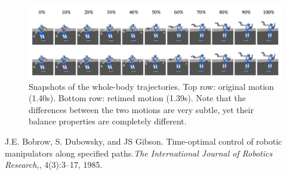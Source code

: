 \documentclass[journal]{IEEEtran}
\begin{document}
\begin{figure}[t]
  \centering
  \includegraphics[width=.9\textwidth]{2.png}
  \caption{Snapshots of the whole-body trajectories. Top row: original motion (1.40s). Bottom row: retimed motion (1.39s). Note that the differences
between the two motions are very subtle, yet their balance properties are completely different.}
  \label{img2}
\end{figure}


\newpage

\begin{thebibliography}{1}


J.E. Bobrow, S. Dubowsky, and JS Gibson. Time-optimal control of robotic manipulators along specified
paths.\emph{The International Journal of Robotics Research,}, 4(3):3–17, 1985.

\end{thebibliography}
\end{document}
